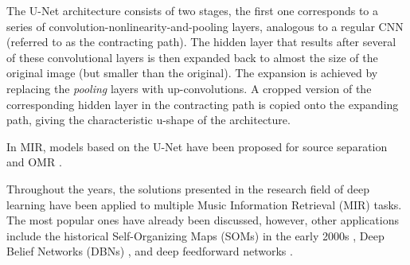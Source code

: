 The U-Net architecture consists of two stages, the first one
corresponds to a series of
convolution-nonlinearity-and-pooling layers, analogous to a
regular CNN (referred to as the contracting path). The
hidden layer that results after several of these
convolutional layers is then expanded back to almost the
size of the original image (but smaller than the original).
The expansion is achieved by replacing the \emph{pooling}
layers with up-convolutions. A cropped version of the
corresponding hidden layer in the contracting path is copied
onto the expanding path, giving the characteristic u-shape
of the architecture.

In MIR, models based on the U-Net have been proposed for
source separation \parencite{jansson2017singing,
stoller2018waveunet} and OMR \parencite{hajic2018towards}.

Throughout the years, the solutions presented in the
research field of deep learning have been applied to
multiple Music Information Retrieval (MIR) tasks. The most
popular ones have already been discussed, however, other
applications include the historical Self-Organizing Maps
(SOMs) in the early 2000s \parencite{kiernan2000scorebased,
harford2003automatic}, Deep Belief Networks (DBNs)
\parencite{hamel2010learning, schmidt2013learning,
chacon2014developing, raczynski2010multiple,
battenberg2012analyzing, herwaarden2014predicting,
zhou2015chord}, and deep feedforward networks
\parencite{cherla2014multiple,  liang2015contentaware,
dawson2018keyfinding, valk2018deep}.
